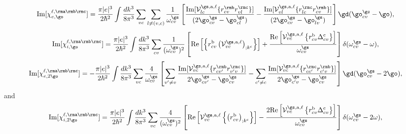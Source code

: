 \begin{equation}\label{calvimchiewn}
\mathrm{Im}[\chi^{\ell,\rma\rmb\rmc}_{e,\go}]= 
\frac{\pi |e|^3}{2\hbar^2}
\int \frac{dk^3}{8\pi^3}
\sum_{vc}\sum_{l\neq(v,c)}\frac{1}{\omega^\gs_{cv}}
\left[
\frac{\mathrm{Im}[\mathcal{V}^{\gs,\text{a},\ell}_{lc}\{r^{\rmb}_{cv}r^{\rmc}_{vl}\}]}
{(2\go^\gs_{cv}-\go^\gs_{cl})} 
-\frac{\mathrm{Im}[\mathcal{V}^{\gs,\text{a},\ell}_{vl}\{r^{\rmc}_{lc}r^{\rmb}_{cv}\}]}
{(2\go^\gs_{cv}-\go^\gs_{lv})}
\right]\gd(\go^\gs_{cv}-\go),
\end{equation}  
\begin{equation}\label{calvimchiwn}
\mathrm{Im}[\chi^{\ell,\rma\rmb\rmc}_{i,\go}]= 
\frac{\pi\vert e\vert^3}{2\hbar^2}
\int \frac{dk^3}{8\pi^3}
\sum_{cv}\frac{1}{(\omega^\gs_{cv})^{2}}
\left[
\mathrm{Re}\left[\left\{r^{\text{b}}_{cv}\left(\mathcal{V}^{\gs,\text{a},\ell}_{vc}\right)_{;k^{\text{c}}}\right\}\right]
+\frac{\mathrm{Re}\left[\mathcal{V}^{\gs,\text{a},\ell}_{vc}\left\{r^{\text{b}}_{cv}
\Delta^{\text{c}}_{cv}\right\}\right]}{\omega^\gs_{cv}} 
\right]\delta(\omega^\gs_{cv}-\omega),
\end{equation}
\begin{equation}\label{calvimchie2wn}
\mathrm{Im}[\chi^{\ell,\rma\rmb\rmc}_{e,2\go}]= 
-\frac{\pi |e|^3}{2\hbar^2}
\int \frac{dk^3}{8\pi^3}
\sum_{vc}\frac{4}{\omega^\gs_{cv}}
\left[
\sum_{v'\ne
  v}\frac{\mathrm{Im}[\mathcal{V}^{\gs,\text{a},\ell}_{vc}\{r^{\rmb}_{cv'}r^{\rmc}_{v'v}\}]}
{2\go^\gs_{cv'}-\go^\gs_{cv}}
- \sum_{c'\ne
  c}\frac{\mathrm{Im}[\mathcal{V}^{\gs,\text{a},\ell}_{vc}\{r^{\rmc}_{cc'}r^{\rmb}_{c'v}\}]}
{2\go^\gs_{c'v}-\go^\gs_{cv}}
\right]\gd(\go^\gs_{cv}-2\go),
\end{equation}
and
\begin{equation}\label{calvimchi2wn}
\mathrm{Im}[\chi^{\ell,\rma\rmb\rmc}_{i,2\go}]= 
 \frac{\pi \vert
   e\vert^{3}}{2\hbar^2}
\int \frac{dk^3}{8\pi^3}
\sum_{vc}\frac{4}{(\omega^\gs_{cv})^{2}}
\left[\mathrm{Re}\left[\mathcal{V}^{\gs,\text{a},\ell}_{vc}\left\{\left(r^{\text{b}}_{cv}\right)_{;k^{\text{c}}}
\right\}\right] -
\frac{2\mathrm{Re}\left[\mathcal{V}^{\gs,\text{a},\ell}_{vc}\left\{r^{\text{b}}_{cv}
\Delta^{\text{c}}_{cv}\right\}\right]}{\omega^\gs_{cv}}\right]\delta(\omega^\gs_{cv}-2\omega)
,
\end{equation}

